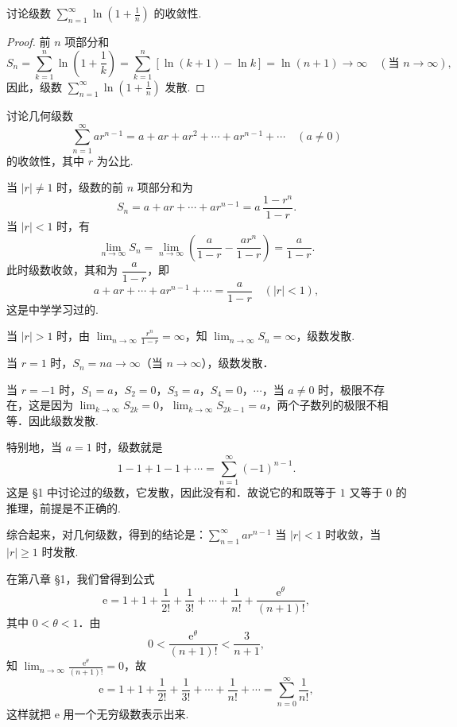 \begin{example}\label{ex:10-2-2}
讨论级数 $\displaystyle\sum_{n=1}^{\infty}\ln\left(1+\frac{1}{n}\right)$ 的收敛性.
\end{example}

\begin{proof}
前 $n$ 项部分和
\[
S_{n}=\sum_{k=1}^{n}\ln\left(1+\frac{1}{k}\right)=\sum_{k=1}^{n}\left[\ln(k+1)-\ln k\right]=\ln(n+1)\to\infty\quad(\text{当 }n\to\infty),
\]
因此，级数 $\displaystyle\sum_{n=1}^{\infty}\ln\left(1+\frac{1}{n}\right)$ 发散.
\end{proof}

\begin{example}[几何级数]\label{ex:10-2-3}
讨论几何级数
\[
\sum_{n=1}^{\infty}ar^{n-1}=a+ar+ar^{2}+\cdots+ar^{n-1}+\cdots\quad(a\neq0)
\]
的收敛性，其中 $r$ 为公比.
\end{example}

当 $|r|\neq1$ 时，级数的前 $n$ 项部分和为
\[
S_{n}=a+ar+\cdots+ar^{n-1}=a\,\frac{1-r^{n}}{1-r}.
\]
当 $|r|<1$ 时，有
\[
\lim_{n\to\infty}S_{n}=\lim_{n\to\infty}\left(\frac{a}{1-r}-\frac{ar^{n}}{1-r}\right)=\frac{a}{1-r}.
\]
此时级数收敛，其和为 $\dfrac{a}{1-r}$，即
\[
a+ar+\cdots+ar^{n-1}+\cdots=\frac{a}{1-r}\quad(|r|<1),
\]
这是中学学习过的.

当 $|r|>1$ 时，由 $\displaystyle\lim_{n\to\infty}\frac{r^{n}}{1-r}=\infty$，知 $\lim_{n\to\infty}S_{n}=\infty$，级数发散.

当 $r=1$ 时，$S_{n}=na\to\infty$（当 $n\to\infty$），级数发散．

当 $r=-1$ 时，$S_{1}=a$，$S_{2}=0$，$S_{3}=a$，$S_{4}=0$，$\cdots$，当 $a\neq0$ 时，极限不存在，这是因为 $\lim_{k\to\infty}S_{2k}=0$，$\lim_{k\to\infty}S_{2k-1}=a$，两个子数列的极限不相等．因此级数发散.

特别地，当 $a=1$ 时，级数就是
\[
1-1+1-1+\cdots=\sum_{n=1}^{\infty}(-1)^{n-1}.
\]
这是 \S1 中讨论过的级数，它发散，因此没有和．故说它的和既等于 $1$ 又等于 $0$ 的推理，前提是不正确的.

综合起来，对几何级数，得到的结论是：$\sum_{n=1}^{\infty}ar^{n-1}$ 当 $|r|<1$ 时收敛，当 $|r|\geq1$ 时发散.

\begin{example}\label{ex:10-2-4}
在第八章 \S1，我们曾得到公式
\[
\mathrm{e}=1+1+\frac{1}{2!}+\frac{1}{3!}+\cdots+\frac{1}{n!}+\frac{\mathrm{e}^{\theta}}{(n+1)!},
\]
其中 $0<\theta<1$．由
\[
0<\frac{\mathrm{e}^{\theta}}{(n+1)!}<\frac{3}{n+1},
\]
知 $\displaystyle\lim_{n\to\infty}\frac{\mathrm{e}^{\theta}}{(n+1)!}=0$，故
\[
\mathrm{e}=1+1+\frac{1}{2!}+\frac{1}{3!}+\cdots+\frac{1}{n!}+\cdots=\sum_{n=0}^{\infty}\frac{1}{n!},
\]
这样就把 $\mathrm{e}$ 用一个无穷级数表示出来.
\end{example}

